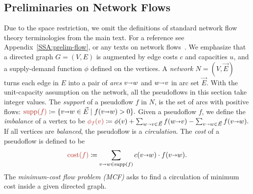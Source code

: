 \documentclass[a4paper,UKenglish]{socg-lipics-v2018}
\def\set#1{\{ #1 \}}
\def\fsupply{\phi}
\def\arcto{\mathord\shortrightarrow}
\def\arc#1#2{#1\arcto#2}
\def\cost{\operatorname{cost}}
\def\supp{\operatorname{supp}}
\theoremstyle{plain}
\numberwithin{figure}{section}
\def\EMPH#1{\textcolor{BrickRed}{{\emph{#1}}}}
\begin{document}
\subsection{Preliminaries on Network Flows}
\label{SS:prelim-flow}

Due to the space restriction, we omit the definitions of standard network flow theory terminologies from the main text.  For a reference see Appendix~\ref{SSA:prelim-flow}, or any texts on network flows~\cite{O93,GHKT17}.
%
We emphasize that a directed graph $G=(V,E)$ is augmented by edge costs $c$ and capacities $u$, and a supply-demand function $\fsupply$ defined on the vertices.  A \EMPH{network $N = (V, \vec{E})$} turns each edge in $E$ into a pair of \EMPH{arcs} $\arc vw$ and $\arc wv$ in arc set $\vec{E}$.
With the unit-capacity assumption on the network, all the pseudoflows in this section take integer values.
The \EMPH{support} of a pseudoflow $f$ in $N$, is the set of arcs with positive flows:
\(
\EMPH{$\supp(f)$} \coloneqq \set{\arc vw \in \vec{E} \mid f(\arc vw) > 0}.
\)
Given a pseudoflow $f$, we define the \EMPH{imbalance} of a vertex to be
\(
\EMPH{$\fsupply_f (v)$} \coloneqq \fsupply(v) + \sum_{\arc wv \in \vec{E}}{f(\arc wv)} - \sum_{\arc vw \in \vec{E}}{f(\arc vw)}.
\)
If all vertices are \emph{balanced}, the pseudoflow is a \EMPH{circulation}.
The \EMPH{cost} of a pseudoflow
is defined to be
\[
 \EMPH{$\cost(f)$} \coloneqq \sum_{\arc vw \in \supp(f)} c(\arc vw) \cdot f(\arc vw).
\]
%
The \EMPH{minimum-cost flow problem (MCF)} asks to find a circulation of minimum cost inside a given directed graph.
\end{document}
